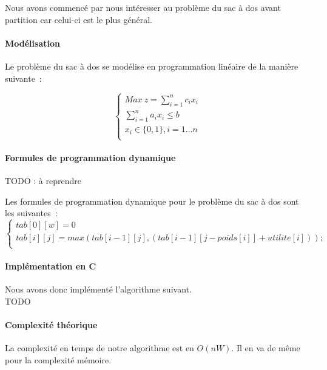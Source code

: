 Nous avons commencé par nous intéresser au problème du sac à dos avant
partition car celui-ci est le plus général.

\paragraph{Modélisation}

Le problème du sac à dos se modélise en programmation linéaire de la
manière suivante~:

\begin{equation}
\begin{cases}
Max~z=\sum_{i=1}^nc_ix_i \\
\sum_{i=1}^na_ix_i \leq b \\
x_i \in\{0, 1\}, i=1\dots n\\
\end{cases}
\end{equation}

\paragraph{Formules de programmation dynamique}

TODO : à reprendre

Les formules de programmation dynamique pour le problème du sac à dos
sont les suivantes~:
\begin{equation}
\begin{cases}
tab[0][w] = 0 \\
tab[i][j] = max(tab[i-1] [j], (tab[i-1] [j-poids[i]] + utilite[i])); \\
\end{cases}
\end{equation}

\paragraph{Implémentation en C}

Nous avons donc implémenté l'algorithme suivant. \\

TODO

  

\paragraph{Complexité théorique}

La complexité en temps de notre algorithme est en $O(nW)$. Il en va de
même pour la complexité mémoire.

